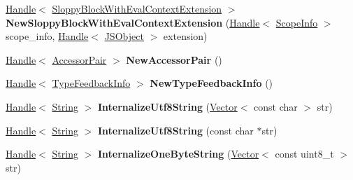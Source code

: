 \begin{DoxyCompactItemize}
\item 
\hyperlink{classv8_1_1internal_1_1_handle}{Handle}$<$ \hyperlink{classv8_1_1internal_1_1_sloppy_block_with_eval_context_extension}{Sloppy\+Block\+With\+Eval\+Context\+Extension} $>$ {\bfseries New\+Sloppy\+Block\+With\+Eval\+Context\+Extension} (\hyperlink{classv8_1_1internal_1_1_handle}{Handle}$<$ \hyperlink{classv8_1_1internal_1_1_scope_info}{Scope\+Info} $>$ scope\+\_\+info, \hyperlink{classv8_1_1internal_1_1_handle}{Handle}$<$ \hyperlink{classv8_1_1internal_1_1_j_s_object}{J\+S\+Object} $>$ extension)\hypertarget{classv8_1_1internal_1_1_factory_a1d6985b3f24884e7a891dfe132722212}{}\label{classv8_1_1internal_1_1_factory_a1d6985b3f24884e7a891dfe132722212}

\item 
\hyperlink{classv8_1_1internal_1_1_handle}{Handle}$<$ \hyperlink{classv8_1_1internal_1_1_accessor_pair}{Accessor\+Pair} $>$ {\bfseries New\+Accessor\+Pair} ()\hypertarget{classv8_1_1internal_1_1_factory_ab8fb47e2c2e5b9c9a1b7a85a563de604}{}\label{classv8_1_1internal_1_1_factory_ab8fb47e2c2e5b9c9a1b7a85a563de604}

\item 
\hyperlink{classv8_1_1internal_1_1_handle}{Handle}$<$ \hyperlink{classv8_1_1internal_1_1_type_feedback_info}{Type\+Feedback\+Info} $>$ {\bfseries New\+Type\+Feedback\+Info} ()\hypertarget{classv8_1_1internal_1_1_factory_a391da198ea758d8e7ac0582634d10065}{}\label{classv8_1_1internal_1_1_factory_a391da198ea758d8e7ac0582634d10065}

\item 
\hyperlink{classv8_1_1internal_1_1_handle}{Handle}$<$ \hyperlink{classv8_1_1internal_1_1_string}{String} $>$ {\bfseries Internalize\+Utf8\+String} (\hyperlink{classv8_1_1internal_1_1_vector}{Vector}$<$ const char $>$ str)\hypertarget{classv8_1_1internal_1_1_factory_a67758bb93032e03abf1a7917734ee068}{}\label{classv8_1_1internal_1_1_factory_a67758bb93032e03abf1a7917734ee068}

\item 
\hyperlink{classv8_1_1internal_1_1_handle}{Handle}$<$ \hyperlink{classv8_1_1internal_1_1_string}{String} $>$ {\bfseries Internalize\+Utf8\+String} (const char $\ast$str)\hypertarget{classv8_1_1internal_1_1_factory_adfd93314d9a0d36db0201d6b9b0832c4}{}\label{classv8_1_1internal_1_1_factory_adfd93314d9a0d36db0201d6b9b0832c4}

\item 
\hyperlink{classv8_1_1internal_1_1_handle}{Handle}$<$ \hyperlink{classv8_1_1internal_1_1_string}{String} $>$ {\bfseries Internalize\+One\+Byte\+String} (\hyperlink{classv8_1_1internal_1_1_vector}{Vector}$<$ const uint8\+\_\+t $>$ str)\hypertarget{classv8_1_1internal_1_1_factory_a4b28bcecaf9fc12056af343ba044bd66}{}\label{classv8_1_1internal_1_1_factory_a4b28bcecaf9fc12056af343ba044bd66}


\end{DoxyCompactItemize}

